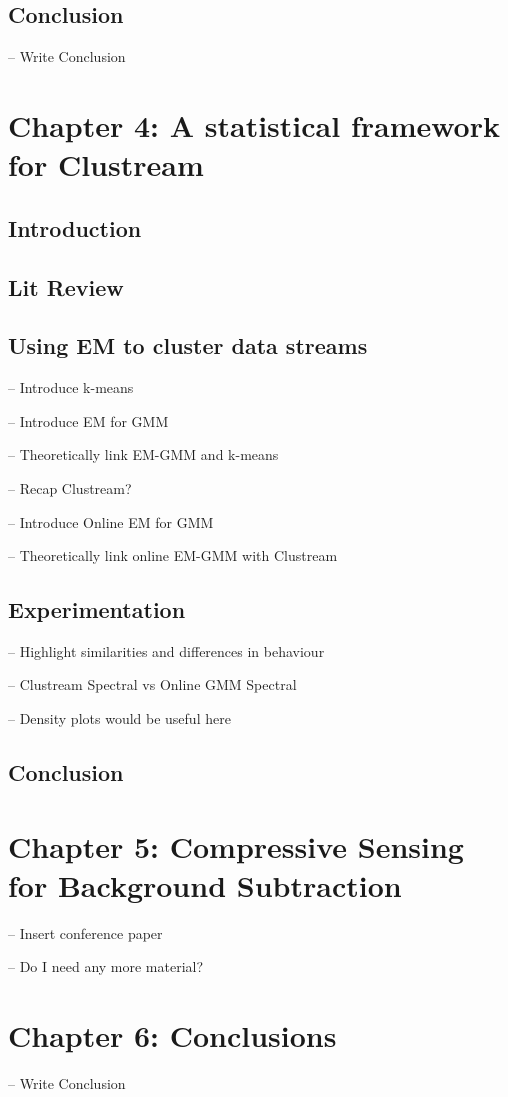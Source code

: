 \documentclass[11pt, a4]{article}
\let\oldmarginpar\marginpar
\renewcommand\marginpar[1]{\-\oldmarginpar[\raggedleft #1]
{\raggedright #1}}
\newenvironment{checklist}{
\begin{list}{}{}
  \let\olditem\item
\renewcommand\item{\olditem -- \marginpar{$\Box$}}
\newcommand\checkeditem{\olditem -- \marginpar{$\CheckedBox$}}
}{
\end{list}
}
\begin{document}
\subsection{Conclusion}
\begin{checklist}
\item Write Conclusion  
\end{checklist}

\section{Chapter 4: A statistical framework for Clustream }
\subsection{Introduction}
\subsection{Lit Review}
\subsection{Using EM to cluster data streams}
\begin{checklist}
\checkeditem  Introduce k-means
\checkeditem Introduce EM for GMM
\checkeditem Theoretically link EM-GMM and k-means
\item Recap Clustream? 
\checkeditem Introduce Online EM for GMM 
\item Theoretically link online EM-GMM with Clustream 
\subsection{Experimentation}
\item Highlight similarities and differences in behaviour 
\item Clustream Spectral vs Online GMM Spectral
\item Density plots would be useful here
\subsection{Conclusion}
\end{checklist}


\section{Chapter 5: Compressive Sensing for Background Subtraction}

\begin{checklist}
  \checkeditem Insert conference paper
  \item Do I need any more material?
\end{checklist}

\section{Chapter 6: Conclusions}

\begin{checklist}
   \item Write Conclusion
\end{checklist}




\end{document}

